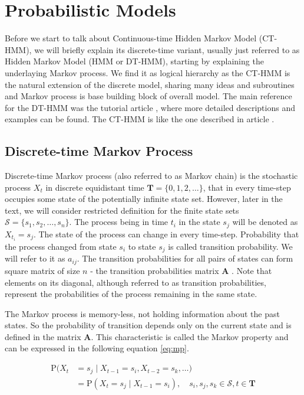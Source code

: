 \documentclass[thesis=M,english]{FITthesis}[2012/10/20]
\newcommand{\matr}[1]{\mathbf{#1}}
\begin{document}

\chapter{Probabilistic Models}

Before we start to talk about Continuous-time Hidden Markov Model (CT-HMM), we will briefly explain its discrete-time variant, usually just referred to as Hidden Markov Model (HMM or DT-HMM), starting by explaining the underlaying Markov process. We find it as logical hierarchy as the CT-HMM is the natural extension of the discrete model, sharing many ideas and subroutines and Markov process is base building block of overall model. The main reference for the DT-HMM was the tutorial article \cite{Ra89}, where more detailed descriptions and examples can be found. The CT-HMM is like the one described in article \cite{Li15}.

\section{Discrete-time Markov Process}\label{sec:DMP}
    
Discrete-time Markov process (also referred to as Markov chain) \cite{TODO} is the stochastic process $X_t$ in discrete equidistant time $\matr{T} = \{ 0, 1, 2, \dots \}$, that in every time-step occupies some state of the potentially infinite state set. However, later in the text, we will consider restricted definition for the finite state sets $\mathcal{S} = \{ s_1, s_2, \dots, s_n\}$.  The process being in time $t_i$ in the state $s_j$ will be denoted as $X_{t_i} = s_j$. The state of the process can change in every time-step. Probability that the process changed from state $s_i$ to state $s_j$ is called transition probability. We will refer to it as $a_{ij}$. The transition probabilities for all pairs of states can form square matrix of size $n$ - the transition probabilities matrix $\matr{A}$ . Note that elements on its diagonal, although referred to as transition probabilities, represent the probabilities of the process remaining in the same state.

The Markov process is memory-less, not holding information about the past states. So the probability of transition depends only on the current state and is defined in the matrix $\matr{A}$. This characteristic is called the Markov property and can be expressed in the following equation \eqref{eq:mp}.

\begin{equation}\label{eq:mp}
\begin{aligned}
\mathrm{P}(X_t & = s_j \mid X_{t-1} = s_i, X_{t-2} = s_k, \dots)  \\   
               & = \mathrm{P}(X_t = s_j \mid X_{t-1} = s_i ), \quad s_i,s_j,s_k \in \mathcal{S}, t \in \matr{T}
\end{aligned}
\end{equation}
\end{document}
